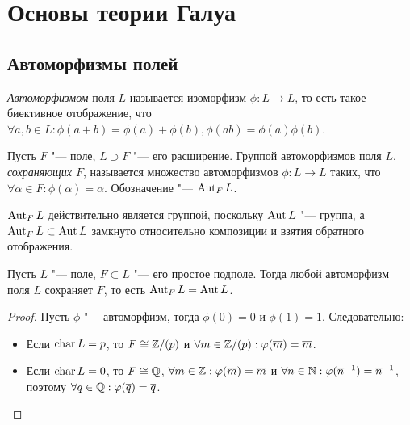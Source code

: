 \section{Основы теории Галуа}

\subsection{Автоморфизмы полей}

\begin{definition}
	\textit{Автоморфизмом} поля $L$ называется изоморфизм $\phi: L \to L$, то есть такое биективное отображение, что $\forall a, b \in L: \phi(a + b) = \phi(a) + \phi(b), \phi(ab) = \phi(a)\phi(b)$.
\end{definition}

\begin{definition}
	Пусть $F$ "--- поле, $L \supset F$ "--- его расширение. Группой автоморфизмов поля $L$, \textit{сохраняющих $F$}, называется множество автоморфизмов $\phi : L \to L$ таких, что $\forall \alpha \in F: \phi(\alpha) = \alpha$. Обозначение "--- $\operatorname{Aut}_F{L}$.
\end{definition}

\begin{note}
	$\operatorname{Aut}_F{L}$ действительно является группой, поскольку $\operatorname{Aut}{L}$ "--- группа, а $\operatorname{Aut}_F{L} \subset \operatorname{Aut}{L}$ замкнуто относительно композиции и взятия обратного отображения.
\end{note}

\begin{proposition}
	Пусть $L$ "--- поле, $F \subset L$ "--- его простое подполе. Тогда любой автоморфизм поля $L$ сохраняет $F$, то есть $\operatorname{Aut}_F{L} = \operatorname{Aut}{L}$.
\end{proposition}

\begin{proof}
	Пусть $\phi$ "--- автоморфизм, тогда $\phi(0) = 0$ и $\phi(1) = 1$. Следовательно:
	\begin{itemize}
		\item Если $\operatorname{char}{L} = p$, то $F \cong \mathbb{Z}/(p)$ и $\forall m \in \mathbb{Z}/(p): \varphi(\overline{m}) = \overline{m}$.
		\item Если $\operatorname{char}{L} = 0$, то $F \cong \mathbb{Q}$, $\forall m \in \mathbb{Z}: \varphi(\overline{m}) = \overline{m}$ и $\forall n \in \mathbb{N}: \varphi(\overline{n}^{-1}) = \overline{n}^{-1}$, поэтому $\forall q \in \mathbb{Q}: \varphi(\overline{q}) = \overline{q}$.\qedhere
	\end{itemize}
\end{proof}

